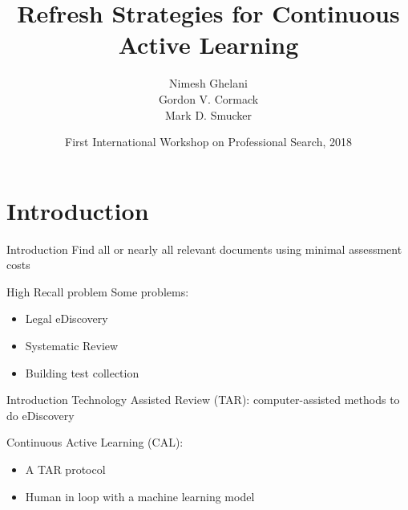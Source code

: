\documentclass[14pt]{beamer}
\title[Your Short Title]{Refresh Strategies for Continuous Active Learning}
\author{Nimesh Ghelani \\ Gordon V. Cormack \\ Mark D. Smucker}
\institute{University of Waterloo}
\date{First International Workshop on Professional Search, 2018}
\begin{document}

\begin{frame}
  \titlepage
\end{frame}




\section{Introduction}
\begin{frame}{Introduction}
    Find all or nearly all relevant documents using minimal assessment costs
    \vskip 1cm

    \pause
    High Recall problem
    \vskip 1cm
    Some problems:
    \begin{itemize}
        \item Legal eDiscovery
        \item Systematic Review
        \item Building test collection
    \end{itemize}

\end{frame}

\begin{frame}{Introduction}
    Technology Assisted Review (TAR): computer-assisted methods to do eDiscovery

    \vskip 1cm
    \pause
    Continuous Active Learning (CAL):
    \begin{itemize}
        \item A TAR protocol
        \item Human in loop with a machine learning model
    \end{itemize}
\end{frame}
\end{document}
